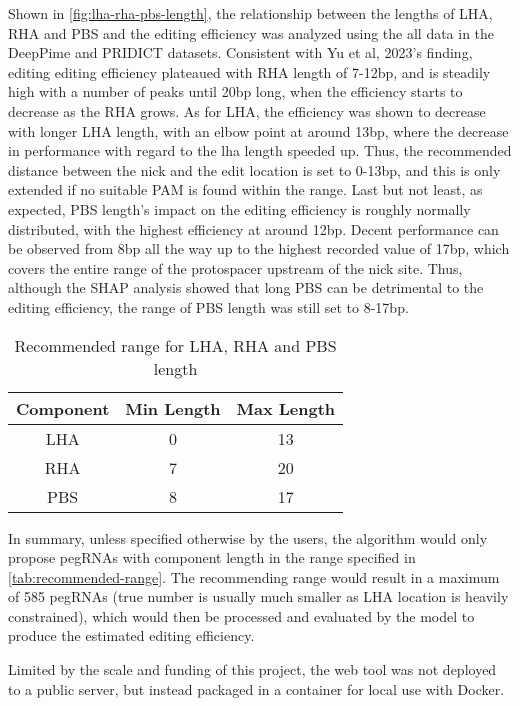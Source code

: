 Shown in \autoref{fig:lha-rha-pbs-length}, the relationship between the lengths of LHA, RHA and PBS and the editing efficiency was analyzed using the all data in the DeepPime and PRIDICT datasets. Consistent with Yu et al, 2023's finding, editing editing efficiency plateaued with RHA length of 7-12bp, and is steadily high with a number of peaks until 20bp long, when the efficiency starts to decrease as the RHA grows.  As for LHA, the efficiency was shown to decrease with longer LHA length, with an elbow point at around 13bp, where the decrease in performance with regard to the lha length speeded up. Thus, the recommended distance between the nick and the edit location is set to 0-13bp, and this is only extended if no suitable PAM is found within the range. Last but not least, as expected, PBS length's impact on the editing efficiency is roughly normally distributed, with the highest efficiency at around 12bp. Decent performance can be observed from 8bp all the way up to the highest recorded value of 17bp, which covers the entire range of the protospacer upstream of the nick site. Thus, although the SHAP analysis showed that long PBS can be detrimental to the editing efficiency, the range of PBS length was still set to 8-17bp.

\begin{table}[ht]
    \centering
    \begin{tabular}{c|c|c}
        \textbf{Component} & \textbf{Min Length} & \textbf{Max Length} \\
        \hline
        LHA & 0 & 13 \\
        RHA & 7 & 20 \\
        PBS & 8 & 17 \\
    \end{tabular}
    \caption{Recommended range for LHA, RHA and PBS length}
    \label{tab:recommended-range}
\end{table}

In summary, unless specified otherwise by the users, the algorithm would only propose pegRNAs with component length in the range specified in \autoref{tab:recommended-range}. The recommending range would result in a maximum of 585 pegRNAs (true number is usually much smaller as LHA location is heavily constrained), which would then be processed and evaluated by the model to produce the estimated editing efficiency.




Limited by the scale and funding of this project, the web tool was not deployed to a public server, but instead packaged in a container for local use with Docker. 

